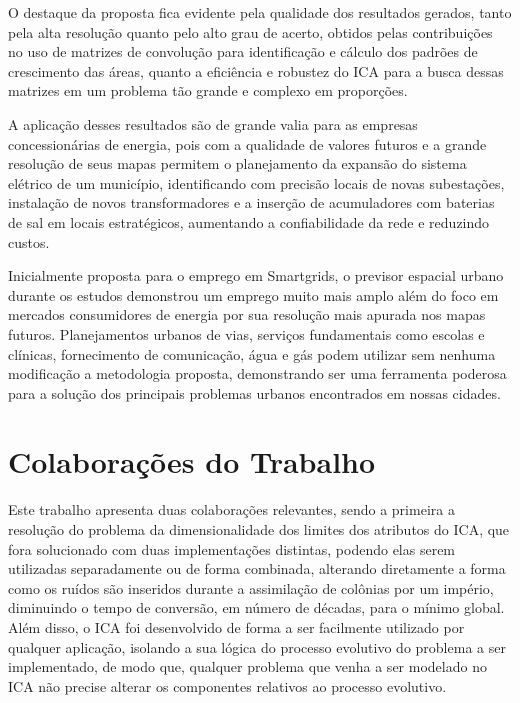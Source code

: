 O destaque da proposta fica evidente pela qualidade dos resultados gerados, tanto pela alta resolução quanto pelo alto grau de acerto, obtidos pelas contribuições no uso de matrizes de convolução para identificação e cálculo dos padrões de crescimento das áreas, quanto a eficiência e robustez do ICA para a busca dessas matrizes em um problema tão grande e complexo em proporções.

A aplicação desses resultados são de grande valia para as empresas concessionárias de energia, pois com a qualidade de valores futuros e a grande resolução de seus mapas permitem o planejamento da expansão do sistema elétrico de um município, identificando com precisão locais de novas subestações, instalação de novos transformadores e a inserção de acumuladores com baterias de sal em locais estratégicos, aumentando a confiabilidade da rede e reduzindo custos.

Inicialmente proposta para o emprego em Smartgrids, o previsor espacial urbano durante os estudos demonstrou um emprego muito mais amplo além do foco em mercados consumidores de energia por sua resolução mais apurada nos mapas futuros. Planejamentos urbanos de vias, serviços fundamentais como escolas e clínicas, fornecimento de comunicação, água e gás podem utilizar sem nenhuma modificação a metodologia proposta, demonstrando ser uma ferramenta poderosa para a solução dos principais problemas urbanos encontrados em nossas cidades. 

\section{Colaborações do Trabalho}
\label{colaborações_do_trabalho}


Este trabalho apresenta duas colaborações relevantes, sendo a primeira a resolução do problema da dimensionalidade dos limites dos atributos do ICA, que fora solucionado com duas implementações distintas, podendo elas serem utilizadas separadamente ou de forma combinada, alterando diretamente a forma como os ruídos são inseridos durante a assimilação de colônias por um império, diminuindo o tempo de conversão, em número de décadas, para o mínimo global. Além disso, o ICA foi desenvolvido de forma a ser facilmente utilizado por qualquer aplicação, isolando a sua lógica do processo evolutivo do problema a ser implementado, de modo que, qualquer problema que venha a ser modelado no ICA não precise alterar os componentes relativos ao processo evolutivo. 

